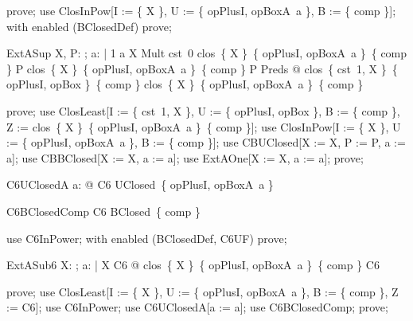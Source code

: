 \documentclass{article}
\begin{document}
\begin{zproof}
prove;
use ClosInPow[I := \{ X \}, U := \{ opPlusI, opBoxA~a \}, B := \{ comp \}];
with enabled (BClosedDef) prove;
\end{zproof}

\begin{theorem}{ExtASup}
  \forall X, P: \nat \fun \nat; a: \nat | 1 \leq a \land X \in Mult \land cst~0 \in clos~\{ X \}~\{ opPlusI, opBoxA~a \}~\{ comp \} \land P \in clos~\{ X \}~\{ opPlusI, opBoxA~a \}~\{ comp \} \land P \in Preds @
    clos~\{ cst~1, X \}~\{ opPlusI, opBox \}~\{ comp \} \subseteq clos~\{ X \}~\{ opPlusI, opBoxA~a \}~\{ comp \}
\end{theorem}

\begin{zproof}
prove;
use ClosLeast[I := \{ cst~1, X \}, U := \{ opPlusI, opBox \}, B := \{ comp \}, Z := clos~\{ X \}~\{ opPlusI, opBoxA~a \}~\{ comp \}];
use ClosInPow[I := \{ X \}, U := \{ opPlusI, opBoxA~a \}, B := \{ comp \}];
use CBUClosed[X := X, P := P, a := a];
use CBBClosed[X := X, a := a];
use ExtAOne[X := X, a := a];
prove;
\end{zproof}

\begin{theorem}{C6UClosedA}
  \forall a: \nat @ C6 \in UClosed~\{ opPlusI, opBoxA~a \}
\end{theorem}


\begin{theorem}{C6BClosedComp}
  C6 \in BClosed~\{ comp \}
\end{theorem}

\begin{zproof}
use C6InPower;
with enabled (BClosedDef, C6UF) prove;
\end{zproof}

\begin{theorem}{ExtASub6}
  \forall X: \nat \fun \nat; a: \nat | X \in C6 @ clos~\{ X \}~\{ opPlusI, opBoxA~a \}~\{ comp \} \subseteq C6
\end{theorem}

\begin{zproof}
prove;
use ClosLeast[I := \{ X \}, U := \{ opPlusI, opBoxA~a \}, B := \{ comp \}, Z := C6];
use C6InPower;
use C6UClosedA[a := a];
use C6BClosedComp;
prove;
\end{zproof}
\end{document}

